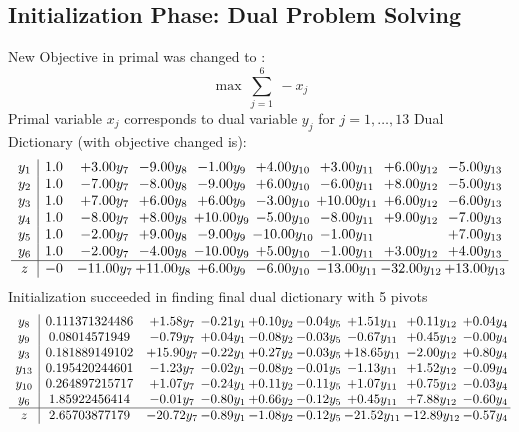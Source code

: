 \documentclass[9pt]{article}
\begin{document}
\subsection{Initialization Phase: Dual Problem Solving}
New Objective in primal was changed to : \[ \max\ \sum_{j=1}^{6}\ - x_j \] 
Primal variable $x_j$ corresponds to dual variable $y_j$ for $j = 1,\ldots,13$
Dual Dictionary (with objective changed is): 
\[\begin{array}{c| c c@{\hskip 2pt} c@{\hskip 2pt} c@{\hskip 2pt} c@{\hskip 2pt} c@{\hskip 2pt} c@{\hskip 2pt} c@{\hskip 2pt} }
 y_{1}   &  1.0 & +  3.00 y_{7} & -9.00 y_{8} & -1.00 y_{9} & +  4.00 y_{10} & +  3.00 y_{11} & +  6.00 y_{12} & -5.00 y_{13}\\
 y_{2}   &  1.0 & -7.00 y_{7} & -8.00 y_{8} & -9.00 y_{9} & +  6.00 y_{10} & -6.00 y_{11} & +  8.00 y_{12} & -5.00 y_{13}\\
 y_{3}   &  1.0 & +  7.00 y_{7} & +  6.00 y_{8} & +  6.00 y_{9} & -3.00 y_{10} & + 10.00 y_{11} & +  6.00 y_{12} & -6.00 y_{13}\\
 y_{4}   &  1.0 & -8.00 y_{7} & +  8.00 y_{8} & + 10.00 y_{9} & -5.00 y_{10} & -8.00 y_{11} & +  9.00 y_{12} & -7.00 y_{13}\\
 y_{5}   &  1.0 & -2.00 y_{7} & +  9.00 y_{8} & -9.00 y_{9} & -10.00 y_{10} & -1.00 y_{11} &   & +  7.00 y_{13}\\
 y_{6}   &  1.0 & -2.00 y_{7} & -4.00 y_{8} & -10.00 y_{9} & +  5.00 y_{10} & -1.00 y_{11} & +  3.00 y_{12} & +  4.00 y_{13}\\
\hline
z    &  -0 & -11.00 y_{7} & + 11.00 y_{8} & +  6.00 y_{9} & -6.00 y_{10} & -13.00 y_{11} & -32.00 y_{12} & + 13.00 y_{13}\\
\end{array}\]
Initialization succeeded in finding final dual dictionary with 5 pivots
\[\begin{array}{c| c c@{\hskip 2pt} c@{\hskip 2pt} c@{\hskip 2pt} c@{\hskip 2pt} c@{\hskip 2pt} c@{\hskip 2pt} c@{\hskip 2pt} }
 y_{8}   &  0.111371324486 & +  1.58 y_{7} & -0.21 y_{1} & +  0.10 y_{2} & -0.04 y_{5} & +  1.51 y_{11} & +  0.11 y_{12} & +  0.04 y_{4}\\
 y_{9}   &  0.08014571949 & -0.79 y_{7} & +  0.04 y_{1} & -0.08 y_{2} & -0.03 y_{5} & -0.67 y_{11} & +  0.45 y_{12} & -0.00 y_{4}\\
 y_{3}   &  0.181889149102 & + 15.90 y_{7} & -0.22 y_{1} & +  0.27 y_{2} & -0.03 y_{5} & + 18.65 y_{11} & -2.00 y_{12} & +  0.80 y_{4}\\
 y_{13}   &  0.195420244601 & -1.23 y_{7} & -0.02 y_{1} & -0.08 y_{2} & -0.01 y_{5} & -1.13 y_{11} & +  1.52 y_{12} & -0.09 y_{4}\\
 y_{10}   &  0.264897215717 & +  1.07 y_{7} & -0.24 y_{1} & +  0.11 y_{2} & -0.11 y_{5} & +  1.07 y_{11} & +  0.75 y_{12} & -0.03 y_{4}\\
 y_{6}   &  1.85922456414 & -0.01 y_{7} & -0.80 y_{1} & +  0.66 y_{2} & -0.12 y_{5} & +  0.45 y_{11} & +  7.88 y_{12} & -0.60 y_{4}\\
\hline
z    &  2.65703877179 & -20.72 y_{7} & -0.89 y_{1} & -1.08 y_{2} & -0.12 y_{5} & -21.52 y_{11} & -12.89 y_{12} & -0.57 y_{4}\\
\end{array}\]
\end{document}
